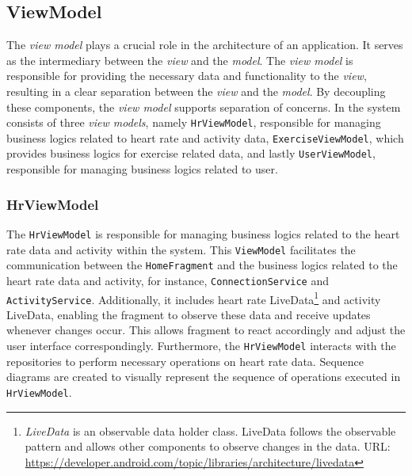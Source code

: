 \subsection{ViewModel}
\label{chap:viewmodel_design}
The \emph{view model} plays a crucial role in the architecture of an application. It serves as the intermediary between the \emph{view} and the \emph{model}.
The \emph{view model} is responsible for providing the necessary data and functionality to the \emph{view}, resulting in a clear separation between the \emph{view} and the \emph{model}.
By decoupling these components, the \emph{view model} supports separation of concerns.
In the system consists of three \emph{view models}, namely \texttt{HrViewModel}, responsible for managing business logics related to heart rate and activity data, \texttt{ExerciseViewModel}, which provides business logics for exercise related data, and lastly \texttt{UserViewModel}, responsible for managing business logics related to user.

\subsubsection{HrViewModel}
\label{chap:hrviewmodel_design}
The \texttt{HrViewModel} is responsible for managing business logics related to the heart rate data and activity within the system.
This \texttt{ViewModel} facilitates the communication between the \texttt{HomeFragment} and the business logics related to the heart rate data and activity, for instance, \texttt{ConnectionService} and \texttt{ActivityService}.
Additionally, it includes heart rate LiveData\footnote{\emph{LiveData} is an observable data holder class. LiveData follows the observable pattern and allows other components to observe changes in the data. URL: \url{https://developer.android.com/topic/libraries/architecture/livedata}} and activity LiveData, enabling the fragment to observe these data and receive updates whenever changes occur. This allows fragment to react accordingly and adjust the user interface correspondingly.
Furthermore, the \texttt{HrViewModel} interacts with the repositories to perform necessary operations on heart rate data.
Sequence diagrams are created to visually represent the sequence of operations executed in \texttt{HrViewModel}.

